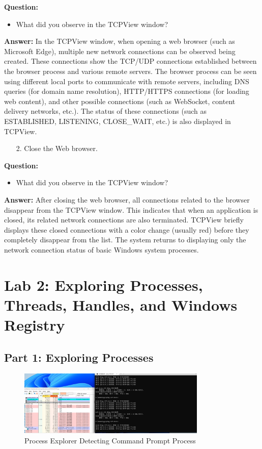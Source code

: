 \documentclass[12pt,a4paper]{article}
\begin{document}
\textbf{Question:}
\begin{itemize}
    \item What did you observe in the TCPView window?
\end{itemize}

\textbf{Answer:}
In the TCPView window, when opening a web browser (such as Microsoft Edge), multiple new network connections can be observed being created. These connections show the TCP/UDP connections established between the browser process and various remote servers. The browser process can be seen using different local ports to communicate with remote servers, including DNS queries (for domain name resolution), HTTP/HTTPS connections (for loading web content), and other possible connections (such as WebSocket, content delivery networks, etc.). The status of these connections (such as ESTABLISHED, LISTENING, CLOSE\_WAIT, etc.) is also displayed in TCPView.

\begin{enumerate}
    \item[2.] Close the Web browser.
\end{enumerate}

\textbf{Question:}
\begin{itemize}
    \item What did you observe in the TCPView window?
\end{itemize}

\textbf{Answer:}
After closing the web browser, all connections related to the browser disappear from the TCPView window. This indicates that when an application is closed, its related network connections are also terminated. TCPView briefly displays these closed connections with a color change (usually red) before they completely disappear from the list. The system returns to displaying only the network connection status of basic Windows system processes.

\section{Lab 2: Exploring Processes, Threads, Handles, and Windows Registry}

\subsection{Part 1: Exploring Processes}

\begin{figure}[H]
    \centering
    \includegraphics[width=0.8\textwidth]{cmd.png}
    \caption{Process Explorer Detecting Command Prompt Process}
    \label{fig:cmd}
\end{figure}
\end{document}
